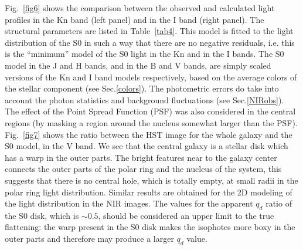 \documentclass[preprint]{aastex}
\begin{document}
Fig.~\ref{fig6}  shows the comparison between the
observed and calculated light profiles in the Kn band (left panel) and in 
the I band (right panel). 
The structural parameters are listed in Table~\ref{tab4}. 
This model is fitted to the light
distribution of the S0 in such a way that there are no negative residuals,
i.e. this is the ``minimum'' model of the S0 light in the Kn and in the I
bands. The S0 model in the J and H bands, and in the B and V bands, are 
simply scaled versions of the Kn and I band models respectively,  
based on the average colors of the stellar component 
(see Sec.\ref{colors}).
The photometric errors do take into account the photon statistics
and background fluctuations (see Sec.\ref{NIRobs}). 
The effect of the Point Spread Function (PSF) was also considered in 
the central regions (by masking a region around the nucleus somewhat larger 
than the PSF). Fig.~\ref{fig7} shows
the ratio between the HST image for the whole galaxy and the S0 model, 
in the V band.
We see that the central galaxy is a stellar disk which has a warp in
the outer parts.  
The bright features near to the galaxy center connects
the outer parts of the polar ring and the nucleus of the system, this suggests
that there is no central hole, which is totally empty, at small radii 
in the polar ring light distribution. Similar results are 
obtained for the 2D modeling of the light distribution in the
NIR images. 
The values for the apparent $q_d$ ratio of the S0 disk, which is $\sim 0.5$,
should be considered an upper limit to the true flattening: 
the warp present in the S0 disk makes the isophotes more boxy in the
outer parts and therefore may produce a larger $q_d$ value. 
\end{document}
